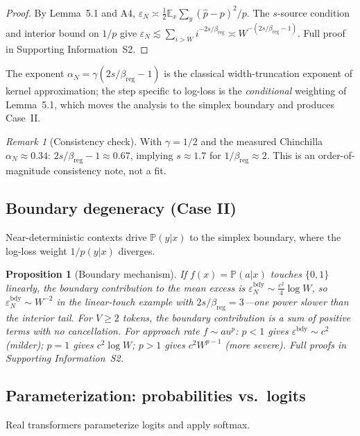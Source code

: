 \documentclass[12pt]{article}
\newcommand{\eps}{\varepsilon}
\newcommand{\E}{\mathbb{E}}
\newcommand{\Prob}{\mathbb{P}}
\newtheorem{proposition}[theorem]{Proposition}
\theoremstyle{remark}
\newtheorem{remark}{Remark}
\begin{document}
\begin{proof}
By Lemma~5.1 and A4, $\eps_N\!\asymp\!\frac12\E_x\sum_y
(\hat p\!-\!p)^2/p$. The $s$-source condition and interior bound on $1/p$ give
$\eps_N\!\lesssim\!\sum_{i>W} i^{-2s/\beta_{\mathrm{reg}}}
\!\asymp\! W^{-(2s/\beta_{\mathrm{reg}}-1)}$.
Full proof in Supporting Information~S2.
\end{proof}

The exponent $\alpha_N=\gamma(2s/\beta_{\mathrm{reg}}-1)$ is the classical
width-truncation exponent of kernel approximation; the step specific to log-loss is
the \emph{conditional} weighting of Lemma~5.1, which moves the
analysis to the simplex boundary and produces Case~II.

\begin{remark}[Consistency check]
\label{rem:chinchilla}
With $\gamma=1/2$ and the measured Chinchilla $\alpha_N\approx0.34$:
$2s/\beta_{\mathrm{reg}}-1\approx0.67$, implying $s\approx1.7$ for
$1/\beta_{\mathrm{reg}}\approx2$. This is an order-of-magnitude consistency note, not a fit.
\end{remark}

\subsection{Boundary degeneracy (Case II)}
Near-deterministic contexts drive $\Prob(y|x)$ to the simplex boundary, where
the log-loss weight $1/p(y|x)$ diverges.

\begin{proposition}[Boundary mechanism]
\label{prop:boundary}
If $f(x)=\Prob(a|x)$ touches $\{0,1\}$ linearly, the boundary contribution to
the mean excess is $\eps_N^{\mathrm{bdy}}\sim\frac{c^2}{4}\log W$, so
$\eps_N^{\mathrm{bdy}}\sim W^{-2}$ in the linear-touch example with
$2s/\beta_{\mathrm{reg}}=3$---one power \emph{slower} than the interior tail.
For $V\!\ge\!2$ tokens, the boundary contribution is a sum of positive terms
with no cancellation.
For approach rate $f\sim au^p$: $p<1$ gives $\eps^{\mathrm{bdy}}\sim c^2$ (milder);
$p=1$ gives $c^2\log W$; $p>1$ gives $c^2 W^{p-1}$ (more severe).
Full proofs in Supporting Information~S2.
\end{proposition}

\subsection{Parameterization: probabilities vs.\ logits}
Real transformers parameterize logits and apply softmax.
\end{document}
